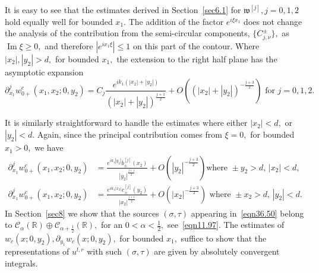 \documentclass[11pt]{article}
\newcommand\fw{\mathfrak w}
\newcommand\cC{\mathcal{C}}
\renewcommand\Im{\operatorname{Im}}
\newcommand\bbR{\mathbb R}
\newcommand\pa{\partial}
\theoremstyle{definition}
\theoremstyle{remark}
\begin{document}
   It is easy to see that the estimates derived in Section~\ref{sec6.1} for
   $\fw^{[j]},j=0,1,2$ hold equally well for bounded $x_1.$ The addition of the
   factor $e^{i\xi x_1}$ does not change the analysis of the contribution from
   the semi-circular components, $\{C^{\pm}_{j,\nu}\},$ as $\Im\xi\geq 0,$ and
   therefore $|e^{ix_1\xi}|\leq 1$ on this part of the contour. Where
   $|x_2|,|y_2|>d,$ for bounded $x_1,$ the extension to the right half plane has
   the asymptotic expansion
   \begin{equation}
      \pa_{x_1}^jw^c_{0+}(x_1,x_2;0,y_2)=
      C_j\frac{e^{ik_1(|x_2|+|y_2|)}}{(|x_2|+|y_2|)^{\frac{j+1}{2}}}+
      O\left((|x_2|+|y_2|)^{-{\frac{j+3}{2}}}\right)
      \text{ for }j=0,1,2.
   \end{equation}
  
   It is similarly straightforward to handle the estimates where either
   $|x_2|<d,$ or $|y_2|<d.$  Again, since the principal
   contribution comes from $\xi=0,$  for bounded $x_1>0,$ 
   we have
    \begin{equation}
       \begin{split}
         \pa_{x_1}^jw^c_{0+}(x_1,x_2;0,y_2)&=
         \frac{e^{ik_1|y_2|}b^{[j]}_{\pm}(x_2)}{|y_2|^{\frac{j+1}{2}}}+O(|y_2|^{-\frac{j+3}{2}})\text{
             where }\pm y_2>d,\,
         |x_2|<d,\\ \pa_{x_1}^jw^c_{0+}(x_1,x_2;0,y_2)&=\frac{e^{ik_1|x_2|}c^{[j]}_{\pm}(y_2)}
         {|x_2|^{\frac{j+1}{2}}}
           +O(|x_2|^{-\frac{j+3}{2}})\text{ where }\pm x_2>d,\, |y_2|<d.
       \end{split}
    \end{equation}
 In Section~\ref{sec8} we show that the sources $(\sigma,\tau)$ appearing
 in~\eqref{eqn36.50} belong to $\cC_{\alpha}(\bbR)\oplus\cC_{\alpha+\frac
   12}(\bbR),$ for an $0<\alpha<\frac 12,$ see~\eqref{eqn11.97}.  The estimates
 of $w_c(x;0,y_2), \pa_{y_1}w_c(x;0,y_2),$ for bounded $x_1,$ suffice to show
 that the representations of $u^{l,r}$ with such $(\sigma,\tau)$ are given by
 absolutely convergent integrals.
\end{document}
